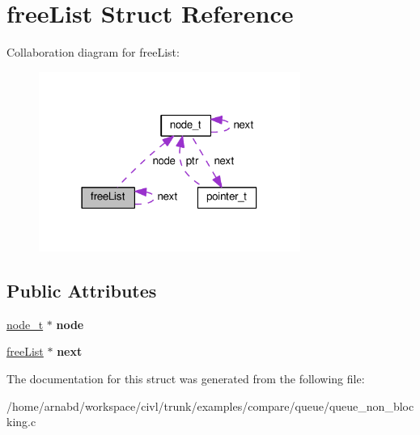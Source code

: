 \hypertarget{structfreeList}{}\section{free\+List Struct Reference}
\label{structfreeList}


Collaboration diagram for free\+List\+:
\nopagebreak
\begin{figure}[H]
\begin{center}
\leavevmode
\includegraphics[width=242pt]{structfreeList__coll__graph}
\end{center}
\end{figure}
\subsection*{Public Attributes}
\begin{DoxyCompactItemize}
\item 
\hypertarget{structfreeList_a5fd4eee9d71f9c2cb07df85dc28ae302}{}\hyperlink{structnode__t}{node\+\_\+t} $\ast$ {\bfseries node}\label{structfreeList_a5fd4eee9d71f9c2cb07df85dc28ae302}

\item 
\hypertarget{structfreeList_a65fe0147d4c0caecdb277ed8574b94f0}{}\hyperlink{structfreeList}{free\+List} $\ast$ {\bfseries next}\label{structfreeList_a65fe0147d4c0caecdb277ed8574b94f0}

\end{DoxyCompactItemize}


The documentation for this struct was generated from the following file\+:\begin{DoxyCompactItemize}
\item 
/home/arnabd/workspace/civl/trunk/examples/compare/queue/queue\+\_\+non\+\_\+blocking.\+c\end{DoxyCompactItemize}
